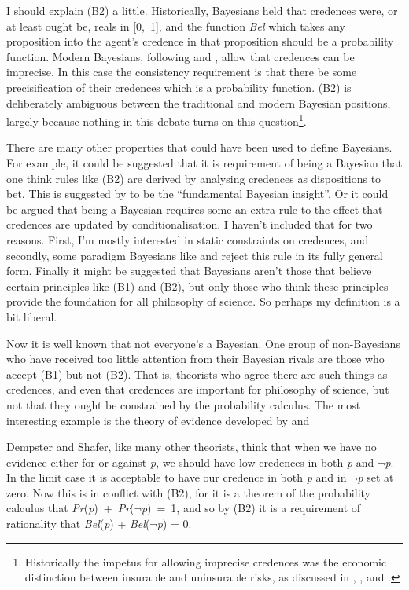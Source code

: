 \noindent I should explain (B2) a little. Historically, Bayesians held that credences were, or at least ought be, reals in [0,~1], and the function \textit{Bel} which takes any proposition into the agent's credence in that proposition should be a probability function. Modern Bayesians, following \citet{Levi1980} and \citet{Jeffrey1983}, allow that credences can be imprecise. In this case the consistency requirement is that there be some precisification of their credences which is a probability function. (B2) is deliberately ambiguous between the traditional and modern Bayesian positions, largely because nothing in this debate turns on this question\footnote{ Historically the impetus for allowing imprecise credences was the economic distinction between insurable and uninsurable risks, as discussed in \citet{Knight1921}, \citet{Keynes1937}, \citet{Tintner1941} and \citet{Hart1942}.}.

There are many other properties that could have been used to define Bayesians. For example, it could be suggested that it is requirement of being a Bayesian that one think rules like (B2) are derived by analysing credences as dispositions to bet. This is suggested by \citet[320]{Kaplan1993} to be the ``fundamental Bayesian insight''. Or it could be argued that being a Bayesian requires some an extra rule to the effect that credences are updated by conditionalisation. I haven't included that for two reasons. First, I'm mostly interested in static constraints on credences, and secondly, some paradigm Bayesians like \citet{Levi1980} and \citet{vanFraassen1989} reject this rule in its fully general form. Finally it might be suggested that Bayesians aren't those that believe certain principles like (B1) and (B2), but only those who think these principles provide the foundation for all philosophy of science. So perhaps my definition is a bit liberal.

Now it is well known that not everyone's a Bayesian. One group of non-Bayesians who have received too little attention from their Bayesian rivals are those who accept (B1) but not (B2). That is, theorists who agree there are such things as credences, and even that credences are important for philosophy of science, but not that they ought be constrained by the probability calculus. The most interesting example is the theory of evidence developed by \citet{Dempster1967, Dempster1968} and \citet{Shafer1976}

Dempster and Shafer, like many other theorists, think that when we have no evidence either for or against \textit{p}, we should have low credences in both \textit{p} and ${\lnot}$\textit{p}. In the limit case it is acceptable to have our credence in both \textit{p} and in ${\lnot}$\textit{p} set at zero. Now this is in conflict with (B2), for it is a theorem of the probability calculus that \textit{Pr}(\textit{p})~+~\textit{Pr}(${\lnot}$\textit{p})~=~1, and so by (B2) it is a requirement of rationality that \textit{Bel}(\textit{p}) + \textit{Bel}(${\lnot}$\textit{p}) = 0. 

